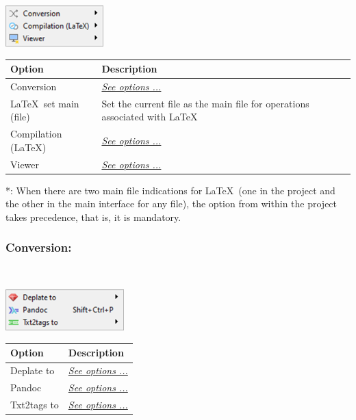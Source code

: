 \includegraphics[scale=0.8]{./res/menu_tools_processing.png}\\

\begin{scriptsize}
  \begin{tabularx}{\textwidth}{>{\hsize=0.3\hsize}X>{\hsize=0.7\hsize}X}\\
    \hline
    \textbf{Option} & \textbf{Description} \\
    \hline
    Conversion & \textit{\href{\#menu\_tools\_processing\_conversion}{See options ...}} \\
    \LaTeX ~set main (file) & Set the current file as the main file for operations associated with \LaTeX* \\
    Compilation (\LaTeX) & \textit{\href{\#menu\_tools\_processing\_conversion\_compilation}{See options ...}} \\
    Viewer & \textit{\href{\#menu\_tools\_processing\_viewer}{See options ...}} \\
    \hline
  \end{tabularx}
\end{scriptsize}
*: When there are two main file indications for \LaTeX ~(one in the project and the other in the main
interface for any file), the option from within the project takes precedence, that is, it is mandatory.

\newpage
\hypertarget{menu_tools_processing_conversion}{}
\subsubsection{Conversion:}\\

\includegraphics[scale=0.8]{./res/menu_tools_processing_conversion.png}\\

\begin{scriptsize}
  \begin{tabularx}{\textwidth}{>{\hsize=0.3\hsize}X>{\hsize=0.7\hsize}X}\\
    \hline
    \textbf{Option} & \textbf{Description} \\
    \hline
    Deplate to & \textit{\href{\#menu\_tools\_processing\_conversion\_deplate}{See options ...}} \\
    Pandoc & \textit{\href{\#menu\_tools\_processing\_conversion\_pandoc}{See options ...}} \\
    Txt2tags to & \textit{\href{\#menu\_tools\_processing\_conversion\_txt2tags}{See options ...}} \\
    \hline
  \end{tabularx}
\end{scriptsize}

